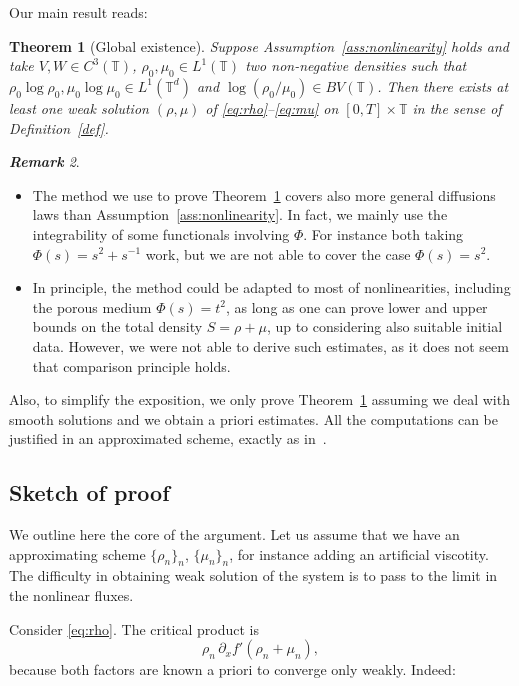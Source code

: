 \documentclass[a4paper,twosided, 11pt]{article}
\newcommand {\T}  { {\mathbb{T}} }
\theoremstyle{plain}
\newtheorem{thm}{Theorem}[section]
\theoremstyle{remark}
\newtheorem{remark}[thm]{\bf Remark}
\numberwithin{equation}{section}
\begin{document}
Our main result reads: 

\begin{thm}[Global existence]\label{thm:main}
Suppose Assumption~\ref{ass:nonlinearity} holds and take $V,W\in C^3(\T)$, $\rho_{0},\mu_{0}\in L^{1}(\T)$ two non-negative densities such that $\rho_0\log\rho_0, \mu_0\log\mu_0\in L^{1}(\T^d)$ and $\log(\rho_0/\mu_0)\in BV(\T)$.
Then there exists at least one weak solution
$(\rho,\mu)$ of \eqref{eq:rho}--\eqref{eq:mu} on $[0,T]\times\T$
in the sense of Definition~\ref{def}. 
\end{thm}

\begin{remark}
\begin{itemize}
\item The method we use to prove Theorem~\ref{thm:main} covers also more general diffusions laws than Assumption~\ref{ass:nonlinearity}. In fact, we mainly use the integrability of some functionals involving $\Phi$. For instance both taking $\Phi(s)= s^2 + s^{-1}$ work, but we are not able to cover the case $\Phi(s) = s^2$.

\item In principle, the method could be adapted to most of nonlinearities, including the porous medium $\Phi(s)=t^2$, as long as one can prove lower and upper bounds on the total density $S=\rho+\mu$, up to considering also suitable initial data. However, we were not able to derive such estimates, as it does not seem that comparison principle holds.
\end{itemize}
\end{remark}


Also, to simplify the exposition, we only prove Theorem~\ref{thm:main} assuming we deal with smooth solutions and we obtain a priori estimates. All the computations can be justified in an approximated scheme, exactly as in~\cite{2025arXiv250418484M}.


\subsection{Sketch of proof}



We outline here the core of the argument.  Let us assume that we have an approximating scheme $\{\rho_n\}_n$, $\{\mu_n\}_n$, for instance adding an artificial viscotity. The difficulty in obtaining weak solution of the system is to pass to the limit in the nonlinear fluxes.

Consider \eqref{eq:rho}.  The critical product is
$$
\rho_n\,\partial_x f'(\rho_n+\mu_n),
$$
because both factors are known a priori to converge only weakly. Indeed:
\end{document}
